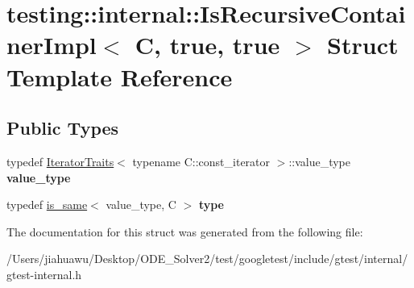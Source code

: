 \hypertarget{structtesting_1_1internal_1_1_is_recursive_container_impl_3_01_c_00_01true_00_01true_01_4}{}\section{testing\+:\+:internal\+:\+:Is\+Recursive\+Container\+Impl$<$ C, true, true $>$ Struct Template Reference}
\label{structtesting_1_1internal_1_1_is_recursive_container_impl_3_01_c_00_01true_00_01true_01_4}
\subsection*{Public Types}
\begin{DoxyCompactItemize}
\item 
\mbox{\label{structtesting_1_1internal_1_1_is_recursive_container_impl_3_01_c_00_01true_00_01true_01_4_a76c73d6db05e50f49ca21946be5ed8c0}} 
typedef \mbox{\hyperlink{structtesting_1_1internal_1_1_iterator_traits}{Iterator\+Traits}}$<$ typename C\+::const\+\_\+iterator $>$\+::value\+\_\+type {\bfseries value\+\_\+type}
\item 
\mbox{\label{structtesting_1_1internal_1_1_is_recursive_container_impl_3_01_c_00_01true_00_01true_01_4_a6bf4fa07dd1c22c5d0ca4ed99c546e9c}} 
typedef \mbox{\hyperlink{structtesting_1_1internal_1_1is__same}{is\+\_\+same}}$<$ value\+\_\+type, C $>$ {\bfseries type}
\end{DoxyCompactItemize}


The documentation for this struct was generated from the following file\+:\begin{DoxyCompactItemize}
\item 
/\+Users/jiahuawu/\+Desktop/\+O\+D\+E\+\_\+\+Solver2/test/googletest/include/gtest/internal/gtest-\/internal.\+h\end{DoxyCompactItemize}
